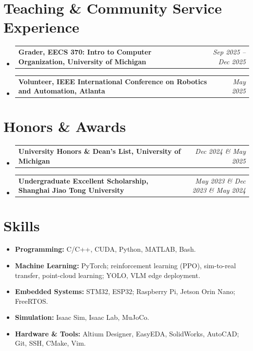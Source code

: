 \documentclass[12pt,letterpaper]{article}
\makeatletter
\newcommand{\resumeItem}[2]{
  \item{
    \textbf{#1}{\hspace{0.5mm}#2 \vspace{-0.5mm}}
  }
}
\newcommand{\resumeOneLine}[2]{
\vspace{0.5mm}\item
    \begin{tabular*}{0.98\linewidth}[t]{l@{\extracolsep{\fill}}r}
        \textbf{#1} & \textit{\footnotesize{#2}}
    \end{tabular*}
    \vspace{-1.2mm}
}
\newcommand{\resumeSubHeadingListStart}{\begin{itemize}[leftmargin=*,labelsep=3mm]}
\newcommand{\resumeHeadingSkillStart}{\begin{itemize}[leftmargin=*,itemsep=1.7mm, rightmargin=2ex]}
\newcommand{\resumeSubHeadingListEnd}{\end{itemize}\vspace{-1mm}}
\newcommand{\resumeHeadingSkillEnd}{\end{itemize}\vspace{-1mm}}
\makeatother
\begin{document}
\section{\textbf{Teaching \& Community Service Experience}}
\vspace{-0.4mm}
\resumeSubHeadingListStart
  \resumeOneLine{Grader, EECS 370: Intro to Computer Organization, University of Michigan}{Sep 2025 -- Dec 2025}
  \resumeOneLine{Volunteer, IEEE International Conference on Robotics and Automation, Atlanta}{May 2025}
\resumeSubHeadingListEnd

\section{\textbf{Honors \& Awards}}
\vspace{-0.4mm}
\resumeSubHeadingListStart
  \resumeOneLine{University Honors \& Dean's List, University of Michigan}{Dec 2024 \& May 2025}
  \resumeOneLine{Undergraduate Excellent Scholarship, Shanghai Jiao Tong University}{May 2023 \& Dec 2023 \& May 2024}
\resumeSubHeadingListEnd


\section{\textbf{Skills}}
\vspace{1.2mm}
\resumeHeadingSkillStart
  \resumeItem{Programming: }{C/C++, CUDA, Python, MATLAB, Bash.}
  \resumeItem{Machine Learning: }{PyTorch; reinforcement learning (PPO), sim-to-real transfer, point-cloud learning; YOLO, VLM edge deployment.}
  \resumeItem{Embedded Systems: }{STM32, ESP32; Raspberry Pi, Jetson Orin Nano; FreeRTOS.}
  \resumeItem{Simulation: }{Isaac Sim, Isaac Lab, MuJoCo.}
  \resumeItem{Hardware \& Tools: }{Altium Designer, EasyEDA, SolidWorks, AutoCAD; Git, SSH, CMake, Vim.}
\resumeHeadingSkillEnd
\end{document}
